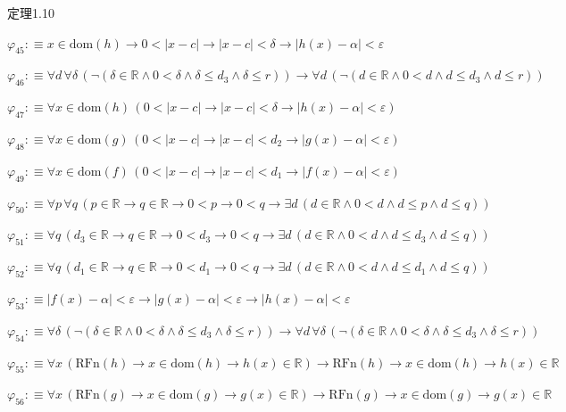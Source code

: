 \begin{fullproof}{定理1.10}
\begin{abbrevlist}
\item $\varphi_{45} :\equiv x \in \mathrm{dom}(h) \to 0 < \lvert x - c \rvert \to \lvert x - c \rvert < \delta \to \lvert h(x) - \alpha \rvert < \varepsilon$
\item $\varphi_{46} :\equiv \forall d\,\forall \delta\,(\neg (\delta \in \mathbb{R} \land 0 < \delta \land \delta \leq d_{3} \land \delta \leq r)) \to \forall d\,(\neg (d \in \mathbb{R} \land 0 < d \land d \leq d_{3} \land d \leq r))$
\item $\varphi_{47} :\equiv \forall x \in \mathrm{dom}(h)\,(0 < \lvert x - c \rvert \to \lvert x - c \rvert < \delta \to \lvert h(x) - \alpha \rvert < \varepsilon)$
\item $\varphi_{48} :\equiv \forall x \in \mathrm{dom}(g)\,(0 < \lvert x - c \rvert \to \lvert x - c \rvert < d_{2} \to \lvert g(x) - \alpha \rvert < \varepsilon)$
\item $\varphi_{49} :\equiv \forall x \in \mathrm{dom}(f)\,(0 < \lvert x - c \rvert \to \lvert x - c \rvert < d_{1} \to \lvert f(x) - \alpha \rvert < \varepsilon)$
\item $\varphi_{50} :\equiv \forall p\,\forall q\,(p \in \mathbb{R} \to q \in \mathbb{R} \to 0 < p \to 0 < q \to \exists d\,(d \in \mathbb{R} \land 0 < d \land d \leq p \land d \leq q))$
\item $\varphi_{51} :\equiv \forall q\,(d_{3} \in \mathbb{R} \to q \in \mathbb{R} \to 0 < d_{3} \to 0 < q \to \exists d\,(d \in \mathbb{R} \land 0 < d \land d \leq d_{3} \land d \leq q))$
\item $\varphi_{52} :\equiv \forall q\,(d_{1} \in \mathbb{R} \to q \in \mathbb{R} \to 0 < d_{1} \to 0 < q \to \exists d\,(d \in \mathbb{R} \land 0 < d \land d \leq d_{1} \land d \leq q))$
\item $\varphi_{53} :\equiv \lvert f(x) - \alpha \rvert < \varepsilon \to \lvert g(x) - \alpha \rvert < \varepsilon \to \lvert h(x) - \alpha \rvert < \varepsilon$
\item $\varphi_{54} :\equiv \forall \delta\,(\neg (\delta \in \mathbb{R} \land 0 < \delta \land \delta \leq d_{3} \land \delta \leq r)) \to \forall d\,\forall \delta\,(\neg (\delta \in \mathbb{R} \land 0 < \delta \land \delta \leq d_{3} \land \delta \leq r))$
\item $\varphi_{55} :\equiv \forall x\,(\mathrm{RFn}(h) \to x \in \mathrm{dom}(h) \to h(x) \in \mathbb{R}) \to \mathrm{RFn}(h) \to x \in \mathrm{dom}(h) \to h(x) \in \mathbb{R}$
\item $\varphi_{56} :\equiv \forall x\,(\mathrm{RFn}(g) \to x \in \mathrm{dom}(g) \to g(x) \in \mathbb{R}) \to \mathrm{RFn}(g) \to x \in \mathrm{dom}(g) \to g(x) \in \mathbb{R}$

\end{abbrevlist}
\end{fullproof}
